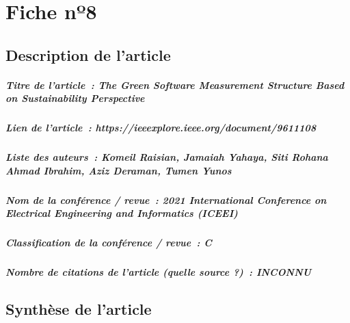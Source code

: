 
\chapter{Fiche nº8} %
\label{app:Fiche8} %

\section{Description de l'article}

\paragraph{Titre de l'article~: \textnormal{The Green Software Measurement Structure Based on Sustainability Perspective}}
\paragraph{Lien de l'article~: \textnormal{https://ieeexplore.ieee.org/document/9611108}}
\paragraph{Liste des auteurs~: \textnormal{Komeil Raisian, Jamaiah Yahaya, Siti Rohana Ahmad Ibrahim, Aziz Deraman, Tumen Yunos}}
\paragraph{Nom de la conférence / revue~: \textnormal{2021 International Conference on Electrical Engineering and Informatics (ICEEI)}}
\paragraph{Classification de la conférence / revue~: \textnormal{C}}
\paragraph{Nombre de citations de l'article (quelle source ?)~: \textnormal{INCONNU}}



\section{Synthèse de l'article}

